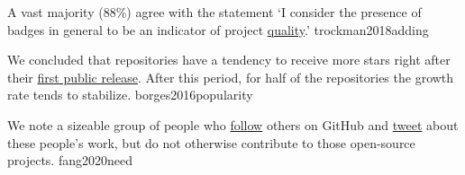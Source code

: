 \documentclass{article}
\begin{document}




  {A vast majority (88\%) agree with the statement `I consider the presence of badges in general to be an indicator of project \ul{quality}.'}
  {trockman2018adding}


  {We concluded that repositories have a tendency to receive more stars right after their \ul{first public release}. After this period, for half of the repositories the growth rate tends to stabilize.}
  {borges2016popularity}

  {We note a sizeable group of people who \ul{follow} others on GitHub and \ul{tweet} about these people’s work, but do not otherwise contribute to those open-source projects.}
  {fang2020need}
\end{document}
